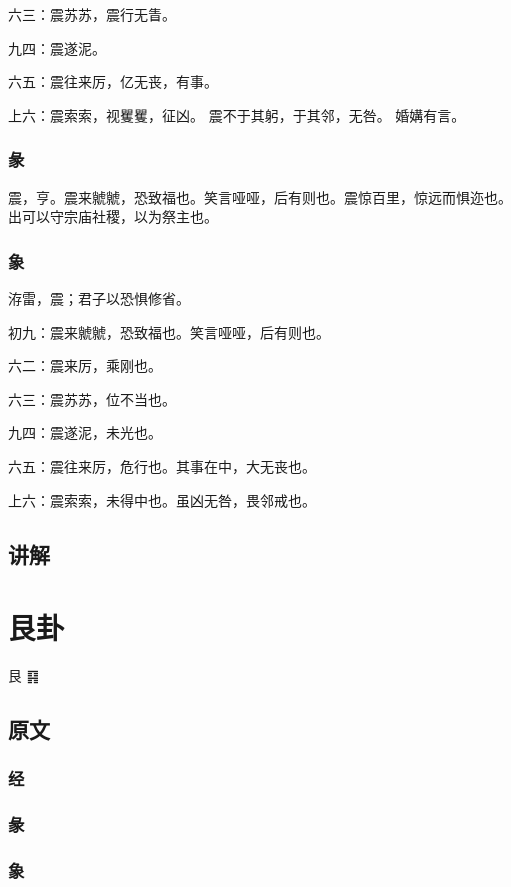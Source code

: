 \documentclass[12pt,oneside]{book}
\begin{document}
六三：震苏苏，震行无眚。

九四：震遂泥。

六五：震往来厉，亿无丧，有事。

上六：震索索，视矍矍，征凶。 震不于其躬，于其邻，无咎。 婚媾有言。

\subsection{彖}
震，亨。震来虩虩，恐致福也。笑言哑哑，后有则也。震惊百里，惊远而惧迩也。 出可以守宗庙社稷，以为祭主也。

\subsection{象}
洊雷，震；君子以恐惧修省。

初九：震来虩虩，恐致福也。笑言哑哑，后有则也。

六二：震来厉，乘刚也。

六三：震苏苏，位不当也。

九四：震遂泥，未光也。

六五：震往来厉，危行也。其事在中，大无丧也。

上六：震索索，未得中也。虽凶无咎，畏邻戒也。


\section{讲解}




\chapter{艮卦}
艮 {\Large ䷳}
\section{原文}

\subsection{经}

\subsection{彖}

\subsection{象}
\end{document}
